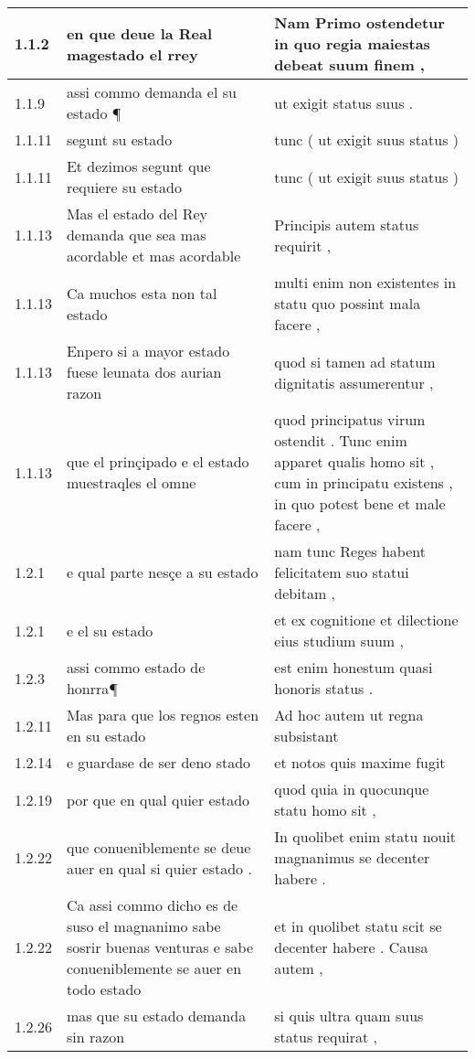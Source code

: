 \begin{tabular}{|p{1cm}|p{6.5cm}|p{6.5cm}|}

\hline
1.1.2 & en que deue la Real magestado el rrey & Nam Primo ostendetur in quo regia maiestas debeat suum finem , \\\hline
1.1.9 & assi commo demanda el su estado ¶ & ut exigit status suus . \\\hline
1.1.11 & segunt su estado & tunc ( ut exigit suus status ) \\\hline
1.1.11 & Et dezimos segunt que requiere su estado & tunc ( ut exigit suus status ) \\\hline
1.1.13 & Mas el estado del Rey demanda que sea mas acordable et mas acordable & Principis autem status requirit , \\\hline
1.1.13 & Ca muchos esta non tal estado & multi enim non existentes in statu quo possint mala facere , \\\hline
1.1.13 & Enpero si a mayor estado fuese leunata dos aurian razon & quod si tamen ad statum dignitatis assumerentur , \\\hline
1.1.13 & que el prinçipado e el estado muestraqles el omne & quod principatus virum ostendit . Tunc enim apparet qualis homo sit , cum in principatu existens , in quo potest bene et male facere , \\\hline
1.2.1 & e qual parte nesçe a su estado & nam tunc Reges habent felicitatem suo statui debitam , \\\hline
1.2.1 & e el su estado & et ex cognitione et dilectione eius studium suum , \\\hline
1.2.3 & assi commo estado de honrra¶ & est enim honestum quasi honoris status . \\\hline
1.2.11 & Mas para que los regnos esten en su estado & Ad hoc autem ut regna subsistant \\\hline
1.2.14 & e guardase de ser deno stado & et notos quis maxime fugit \\\hline
1.2.19 & por que en qual quier estado & quod quia in quocunque statu homo sit , \\\hline
1.2.22 & que conueniblemente se deue auer en qual si quier estado . & In quolibet enim statu nouit magnanimus se decenter habere . \\\hline
1.2.22 & Ca assi commo dicho es de suso el magnanimo sabe sosrir buenas venturas e sabe conueniblemente se auer en todo estado & et in quolibet statu scit se decenter habere . Causa autem , \\\hline
1.2.26 & mas que su estado demanda sin razon & si quis ultra quam suus status requirat , \\\hline

\end{tabular}
